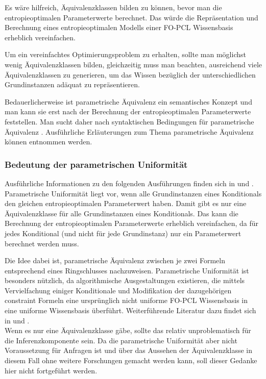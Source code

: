 \documentclass[a4paper, 11pt]{book}
\begin{document}
Es wäre hilfreich, Äquivalenzklassen bilden zu können, bevor man die entropieoptimalen Parameterwerte berechnet. Das würde die Repräsentation und Berechnung eines entropieoptimalen Modells einer FO-PCL Wissensbasis erheblich vereinfachen.

Um ein vereinfachtes Optimierungsproblem zu erhalten, sollte man möglichst wenig Äquivalenzklassen bilden, gleichzeitig muss man beachten, ausreichend viele Äquivalenzklassen zu generieren, um das Wissen bezüglich der unterschiedlichen Grundinstanzen adäquat zu repräsentieren.

Bedauerlicherweise ist parametrische Äquivalenz  ein semantisches Konzept und man kann sie erst nach der Berechnung der entropieoptimalen Parameterwerte feststellen.
Man sucht daher nach syntaktischen Bedingungen für parametrische Äquivalenz . Ausführliche Erläuterungen zum Thema parametrische Äquivalenz können \cite[Kap. 7.1, S. 148ff]{Fis10} entnommen werden.

\subsubsection{Bedeutung der parametrischen Uniformität} 
Ausführliche Informationen zu den folgenden Ausführungen finden sich in \cite[Kap. 7.1.1 und 7.1.2, S. 151-153]{Fis10} und \cite{BHM14}.
Parametrische Uniformität liegt vor, wenn alle Grundinstanzen eines Konditionals den gleichen entropieoptimalen Parameterwert haben. Damit gibt es nur eine Äquivalenzklasse für alle Grundinstanzen eines Konditionals. Das kann die Berechnung der entropieoptimalen Parameterwerte erheblich vereinfachen, da für jedes Konditional (und nicht für jede Grundinstanz) nur ein Parameterwert berechnet werden muss. 

Die Idee dabei ist, parametrische Äquivalenz zwischen je zwei Formeln entsprechend eines Ringschlusses nachzuweisen.
Parametrische Uniformität ist besonders nützlich, da algorithmische Ausgestaltungen existieren, die mittels Vervielfachung einiger Konditionale und Modifikation der dazugehörigen constraint Formeln eine ursprünglich nicht uniforme FO-PCL Wissensbasis in eine uniforme Wissensbasis überführt. Weiterführende Literatur dazu findet sich in \cite[Kap. 5, S.71ff]{BJ11} und \cite{BK15}.\\
Wenn es nur eine Äquivalenzklasse gäbe, sollte das relativ unproblematisch für die Inferenzkomponente sein. Da die parametrische Uniformität aber nicht Voraussetzung für Anfragen ist und über das Aussehen der Äquivalenzklasse in diesem Fall ohne weitere Forschungen gemacht werden kann, soll dieser Gedanke hier nicht fortgeführt werden. 
\end{document}
